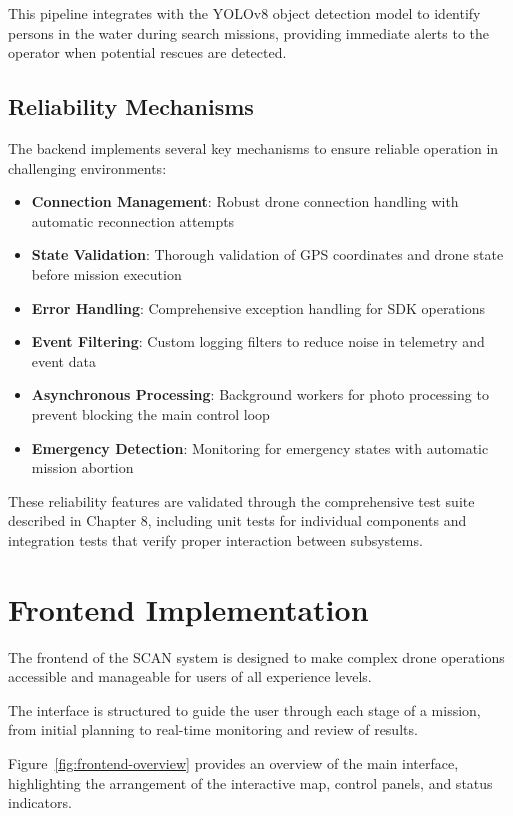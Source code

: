     This pipeline integrates with the YOLOv8 object detection model to identify persons in the water during search missions, providing immediate alerts to the operator when potential rescues are detected.
    
    \subsection{Reliability Mechanisms}
    
    The backend implements several key mechanisms to ensure reliable operation in challenging environments:
    
    \begin{itemize}
        \item \textbf{Connection Management}: Robust drone connection handling with automatic reconnection attempts
        \item \textbf{State Validation}: Thorough validation of GPS coordinates and drone state before mission execution
        \item \textbf{Error Handling}: Comprehensive exception handling for SDK operations
        \item \textbf{Event Filtering}: Custom logging filters to reduce noise in telemetry and event data
        \item \textbf{Asynchronous Processing}: Background workers for photo processing to prevent blocking the main control loop
        \item \textbf{Emergency Detection}: Monitoring for emergency states with automatic mission abortion
    \end{itemize}
    
    These reliability features are validated through the comprehensive test suite described in Chapter 8, including unit tests for individual components and integration tests that verify proper interaction between subsystems.

\section{Frontend Implementation}

The frontend of the SCAN system is designed to make complex drone operations accessible and manageable for users of all experience levels. 

The interface is structured to guide the user through each stage of a mission, from initial planning to real-time monitoring and review of results. 

Figure~\ref{fig:frontend-overview} provides an overview of the main interface, highlighting the arrangement of the interactive map, control panels, and status indicators. 

